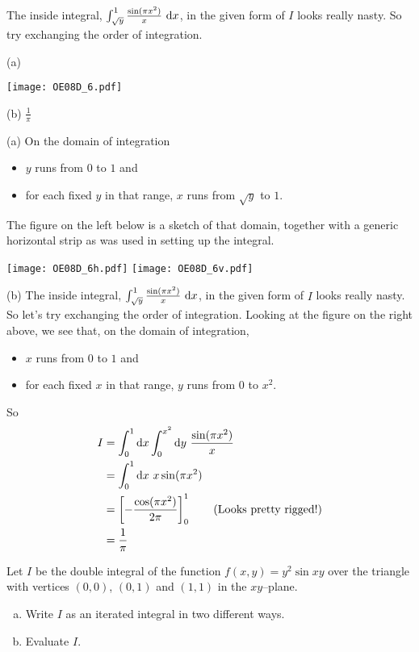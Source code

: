 \begin{hint}
The inside integral, $\int_{\sqrt{y}}^1 \frac{\sin(\pi x^2)}{x}\ \mathrm{d}x$,
in the given form of $I$ looks really nasty.  So try exchanging
the order of integration.
\end{hint}

\begin{answer}
(a)
\begin{center}
     \texttt{[image: OE08D\_6.pdf]}
\end{center}

(b) $\frac{1}{\pi}$
\end{answer}

\begin{solution}
(a)
On the domain of integration
\begin{itemize}
\item
$y$ runs from $0$ to $1$ and
\item
for each fixed $y$ in that range, $x$ runs from $\sqrt{y}$
to $1$.
\end{itemize}
The figure on the left below is a sketch of that domain, together with 
a generic horizontal strip as was used in setting up the integral.

\begin{center}
     \texttt{[image: OE08D\_6h.pdf]}\qquad
     \texttt{[image: OE08D\_6v.pdf]}\qquad
\end{center}

(b) The inside integral, $\int_{\sqrt{y}}^1 \frac{\sin(\pi x^2)}{x}\ \mathrm{d}x$,
in the given form of $I$ looks really nasty.  So let's try exchanging
the order of integration. Looking at the figure on the right above,
we see that, on  the domain of integration,
\begin{itemize}
\item
$x$ runs from $0$ to $1$ and
\item
for each fixed $x$ in that range, $y$ runs from $0$
to $x^2$.
\end{itemize}
So
\begin{align*}
I &= \int_0^1\mathrm{d}x\int_0^{x^2}\mathrm{d}y\ \frac{\sin(\pi x^2)}{x} \\
  &=\int_0^1\mathrm{d}x\ x\sin(\pi x^2) \\
  &=\left[-\frac{\cos(\pi x^2)}{2 \pi}\right]_0^1 
             \qquad\text{(Looks pretty rigged!)}\\
  &=\frac{1}{\pi}
\end{align*}
\end{solution}

\begin{question}[M200 2009A] %
Let $I$ be the double integral of the function $f(x,y) = y^2 \sin xy$ 
over the triangle with vertices $(0, 0)$, $(0, 1)$ and $(1, 1)$ 
in the $xy$--plane.

\begin{enumerate}[(a)]
\item
Write $I$ as an iterated integral in two different ways.

\item 
Evaluate $I$.

\end{enumerate}
\end{question}

